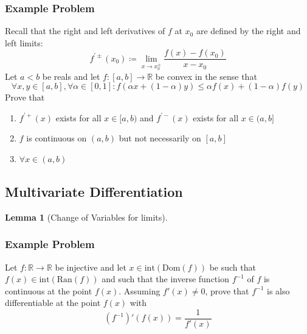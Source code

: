 \documentclass[10pt,letterpaper]{article} %
\newtheorem{lem}{Lemma}[section]
\begin{document}
\subsubsection{Example Problem}
Recall that the right and left derivatives of $f$ at $x_0$ are defined by the right and left limits:
\begin{equation*}
f^{'\pm}(x_0) \coloneq \lim_{x \xrightarrow{} x_0^{\pm}}\frac{f(x) - f(x_0)}{x-x_0}
\end{equation*}
Let $a < b$ be reals and let $f: [a, b] \xrightarrow{} \mathbb{R}$ be convex in the sense that
\begin{equation*}
\forall x, y \in [a, b], \forall \alpha \in [0, 1]: f(\alpha x + (1-\alpha)y) \leqslant \alpha f(x) + (1-\alpha) f(y)
\end{equation*}
Prove that
\begin{enumerate}
\item $f^{'+}(x)$ exists for all $x \in [a, b)$ and $f^{'-}(x)$ exists for all $x \in (a, b]$
\item $f$ is continuous on $(a, b)$ but not necessarily on $[a, b]$
\item $\forall x \in (a, b)$
\end{enumerate}

\subsection{Multivariate Differentiation}
\begin{lem}[Change of Variables for limits]

\end{lem}
\subsubsection{Example Problem}
Let $f: \mathbb{R} \xrightarrow{} \mathbb{R}$ be injective and let $x \in \text{int}(\text{Dom}(f))$ be such that $f(x) \in \text{int}(\text{Ran}(f))$ and such that the inverse function $f^{-1}$ of $f$ is continuous at the point $f(x)$. Assuming $f'(x) \neq 0$, prove that $f^{-1}$ is also differentiable at the point $f(x)$ with
\begin{equation*}
(f^{-1})'(f(x)) = \frac{1}{f'(x)}
\end{equation*}
\end{document}
